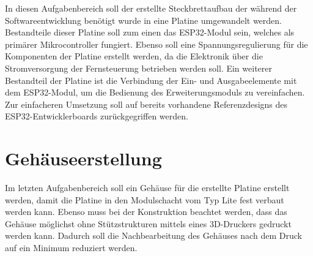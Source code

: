 In diesen Aufgabenbereich soll der erstellte Steckbrettaufbau der während der Softwareentwicklung benötigt wurde in eine Platine umgewandelt werden. Bestandteile dieser Platine soll zum einen das ESP32-Modul sein, welches als primärer Mikrocontroller fungiert. Ebenso soll eine Spannungsregulierung für die Komponenten der Platine erstellt werden, da die Elektronik über die Stromversorgung der Fernsteuerung betrieben werden soll. Ein weiterer Bestandteil der Platine ist die Verbindung der Ein- und Ausgabeelemente mit dem ESP32-Modul, um die Bedienung des Erweiterungsmoduls zu vereinfachen. Zur einfacheren Umsetzung soll auf bereits vorhandene Referenzdesigns des ESP32-Entwicklerboards zurückgegriffen werden.

\section{Gehäuseerstellung}

Im letzten Aufgabenbereich soll ein Gehäuse für die erstellte Platine erstellt werden, damit die Platine in den Modulschacht vom Typ Lite fest verbaut werden kann. Ebenso muss bei der Konstruktion beachtet werden, dass das Gehäuse möglichst ohne Stützstrukturen mittels eines 3D-Druckers gedruckt werden kann. Dadurch soll die Nachbearbeitung des Gehäuses nach dem Druck auf ein Minimum reduziert werden.